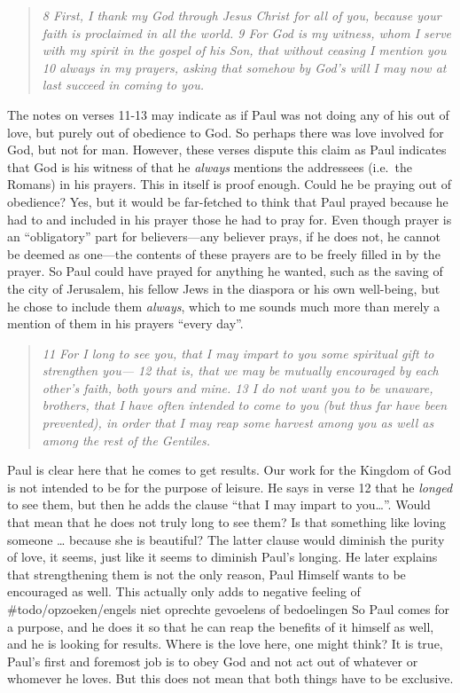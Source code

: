 \begin{quote}
    \emph{8 First, I thank my God through
Jesus Christ for all of you, because your faith is proclaimed in all the
world. 9 For God is my witness, whom I serve with my spirit in the
gospel of his Son, that without ceasing I mention you 10 always in my
prayers, asking that somehow by God's will I may now at last succeed in
coming to you.}
\end{quote}

The notes on verses 11-13 may indicate as if Paul was not doing any of
his out of love, but purely out of obedience to God. So perhaps there
was love involved for God, but not for man. However, these verses
dispute this claim as Paul indicates that God is his witness of that he
\emph{always} mentions the addressees (i.e.~the Romans) in his prayers.
This in itself is proof enough. Could he be praying out of obedience?
Yes, but it would be far-fetched to think that Paul prayed because he
had to and included in his prayer those he had to pray for. Even though
prayer is an ``obligatory'' part for believers---any believer prays, if
he does not, he cannot be deemed as one---the contents of these prayers
are to be freely filled in by the prayer. So Paul could have prayed for
anything he wanted, such as the saving of the city of Jerusalem, his
fellow Jews in the diaspora or his own well-being, but he chose to
include them \emph{always}, which to me sounds much more than merely a
mention of them in his prayers ``every day''.

\begin{quote}
    \emph{11 For I long to see you, that I may impart to you some spiritual
    gift to strengthen you--- 12 that is, that we may be mutually encouraged
    by each other's faith, both yours and mine. 13 I do not want you to be
    unaware, brothers, that I have often intended to come to you (but thus
    far have been prevented), in order that I may reap some harvest among
    you as well as among the rest of the Gentiles.}
\end{quote}

Paul is clear here that he comes to get results. Our work for the
Kingdom of God is not intended to be for the purpose of leisure. He says
in verse 12 that he \emph{longed} to see them, but then he adds the
clause ``that I may impart to you\ldots{}''. Would that mean that he
does not truly long to see them? Is that something like loving someone
\ldots{} because she is beautiful? The latter clause would diminish the
purity of love, it seems, just like it seems to diminish Paul's longing.
He later explains that strengthening them is not the only reason, Paul
Himself wants to be encouraged as well. This actually only adds to
negative feeling of \#todo/opzoeken/engels niet oprechte gevoelens of
bedoelingen So Paul comes for a purpose, and he does it so that he can
reap the benefits of it himself as well, and he is looking for results.
Where is the love here, one might think? It is true, Paul's first and
foremost job is to obey God and not act out of whatever or whomever he
loves. But this does not mean that both things have to be exclusive.

